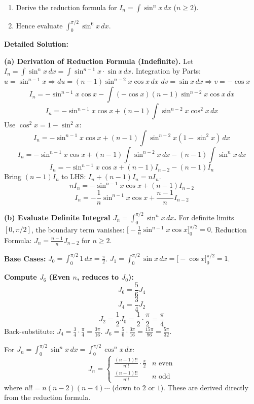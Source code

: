 \documentclass[11pt]{article}
\begin{document}
\begin{exoresolu}
\begin{enumerate}
    \item Derive the reduction formula for $I_n = \int \sin^n x\,dx$ ($n \ge 2$).
    \item Hence evaluate $\displaystyle \int_0^{\pi/2} \sin^6 x\,dx$.
\end{enumerate}
\tcblower
\textbf{Detailed Solution:}

\textbf{(a) Derivation of Reduction Formula (Indefinite).}
Let $I_n = \int \sin^n x\,dx = \int \sin^{n-1}x \cdot \sin x\,dx$.
Integration by Parts:
$u = \sin^{n-1}x \Rightarrow du = (n-1)\sin^{n-2}x \cos x\,dx$
$dv = \sin x\,dx \Rightarrow v = -\cos x$
\[
I_n = -\sin^{n-1}x \cos x - \int (-\cos x)(n-1)\sin^{n-2}x \cos x\,dx
\]
\[
I_n = -\sin^{n-1}x \cos x + (n-1)\int \sin^{n-2}x \cos^2 x\,dx
\]
Use $\cos^2 x = 1 - \sin^2 x$:
\[
I_n = -\sin^{n-1}x \cos x + (n-1)\int \sin^{n-2}x (1-\sin^2 x)\,dx
\]
\[
I_n = -\sin^{n-1}x \cos x + (n-1)\int \sin^{n-2}x\,dx - (n-1)\int \sin^n x\,dx
\]
\[
I_n = -\sin^{n-1}x \cos x + (n-1)I_{n-2} - (n-1)I_n
\]
Bring $(n-1)I_n$ to LHS: $I_n + (n-1)I_n = n I_n$.
\[
n I_n = -\sin^{n-1}x \cos x + (n-1)I_{n-2}
\]
\[
\boxed{I_n = -\frac{1}{n}\sin^{n-1}x \cos x + \frac{n-1}{n}I_{n-2}}
\]

\textbf{(b) Evaluate Definite Integral $J_n = \int_0^{\pi/2} \sin^n x\,dx$.}
For definite limits $[0, \pi/2]$, the boundary term vanishes:
$\Big[-\frac{1}{n}\sin^{n-1}x \cos x\Big]_0^{\pi/2} = 0$.
Reduction Formula: $\boxed{J_n = \frac{n-1}{n} J_{n-2}}$ for $n \ge 2$.

\textbf{Base Cases:}
$J_0 = \int_0^{\pi/2} 1\,dx = \frac{\pi}{2}$.
$J_1 = \int_0^{\pi/2} \sin x\,dx = \Big[-\cos x\Big]_0^{\pi/2} = 1$.

\textbf{Compute $J_6$ (Even $n$, reduces to $J_0$):}
\[
J_6 = \frac{5}{6} J_4
\]
\[
J_4 = \frac{3}{4} J_2
\]
\[
J_2 = \frac{1}{2} J_0 = \frac{1}{2}\cdot\frac{\pi}{2} = \frac{\pi}{4}
\]
Back-substitute:
$J_4 = \frac{3}{4} \cdot \frac{\pi}{4} = \frac{3\pi}{16}$.
$J_6 = \frac{5}{6} \cdot \frac{3\pi}{16} = \frac{15\pi}{96} = \boxed{\frac{5\pi}{32}}$.
\end{exoresolu}

\begin{aretenir}
For $J_n = \int_0^{\pi/2} \sin^n x\,dx = \int_0^{\pi/2} \cos^n x\,dx$:
\[
J_n = \begin{cases}
\frac{(n-1)!!}{n!!}\cdot\frac{\pi}{2} & n \text{ even} \\[6pt]
\frac{(n-1)!!}{n!!} & n \text{ odd}
\end{cases}
\]
where $n!! = n(n-2)(n-4)\cdots$ (down to $2$ or $1$). These are derived directly from the reduction formula.
\end{aretenir}
\end{document}
